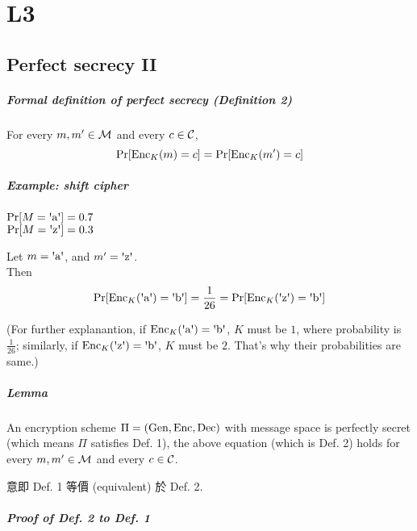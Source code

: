 \section{L3}


\subsection{Perfect secrecy II}

\subparagraph{Formal definition of perfect secrecy (\textbf{Definition 2})}

For every \(m, m' \in \operatorname{\mathcal{M}}\) and every \(c \in \operatorname{\mathcal{C}}\),
\[\Pr[\operatorname{Enc}_K(m) = c] = \Pr[\operatorname{Enc}_K(m') = c]\]

\subparagraph{Example: shift cipher}

\(\Pr[M = \letter{a}] = 0.7\) \\
\(\Pr[M = \letter{z}] = 0.3\)

Let \(m = \letter{a}\), and \(m' = \letter{z}\). \\
Then
\[ \Pr[\Enc_K(\letter{a}) = \letter{b}] = \frac{1}{26} =
\Pr[\Enc_K(\letter{z}) = \letter{b}] \]

(For further explanantion, if \(\Enc_K(\letter{a}) = \letter{b}\), \(K\) must be \(1\), where probability is \(\frac{1}{26}\); similarly, if \(\Enc_K(\letter{z}) = \letter{b}\), \(K\) must be \(2\). That's why their probabilities are same.)

\subparagraph{Lemma}

An encryption scheme \(\Pi = (\operatorname{Gen}, \operatorname{Enc}, \operatorname{Dec})\) with message space is perfectly secret (which means \(\Pi\) satisfies Def. 1), the above equation (which is Def. 2) holds for every \(m, m' \in \operatorname{\mathcal{M}}\) and every \(c \in \operatorname{\mathcal{C}}\).

意即 Def. 1 等價 (equivalent) 於 Def. 2.

\pagebreak

\subparagraph{Proof of Def. 2 to Def. 1}

